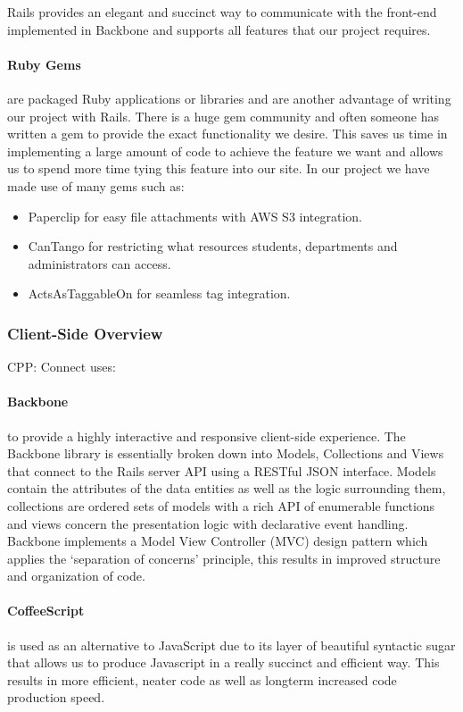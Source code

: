 		Rails provides an elegant and succinct way to communicate with the front-end implemented in Backbone and supports all features that our project requires. 

		\paragraph{Ruby Gems\cite{gems}} are packaged Ruby applications or libraries and are another advantage of writing our project with Rails. There is a huge gem community and often someone has written a gem to provide the exact functionality we desire. This saves us time in implementing a large amount of code to achieve the feature we want and allows us to spend more time tying this feature into our site. In our project we have made use of many gems such as:
		\begin{itemize}
		 \item Paperclip\cite{paperclip} for easy file attachments with AWS S3\cite{s3} integration.
		 \item CanTango\cite{cantango} for restricting what resources students, departments and administrators can access.
		 \item ActsAsTaggableOn\cite{tags} for seamless tag integration.
		\end{itemize}
	\subsubsection{Client-Side Overview}
		CPP: Connect uses:
		\paragraph{Backbone\cite{backbone}} to provide a highly interactive and responsive client-side experience. The Backbone library is essentially broken down into Models, Collections and Views that connect to the Rails server API using a RESTful JSON interface. Models contain the attributes of the data entities as well as the logic surrounding them, collections are ordered sets of models with a rich API of enumerable functions and views concern the presentation logic with declarative event handling. Backbone implements a Model View Controller (MVC) design pattern which applies the `separation of  concerns' principle, this results in improved structure and organization of code.
		\paragraph{CoffeeScript\cite{coffeescript}} is used as an alternative to JavaScript due to its layer of beautiful syntactic sugar that allows us to produce Javascript in a really succinct and efficient way. This results in more efficient, neater code as well as longterm increased code production speed.
